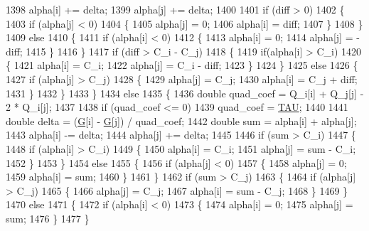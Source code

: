 \begin{DoxyCode}
1398       alpha[i] += delta;
1399       alpha[j] += delta;
1400       
1401       \textcolor{keywordflow}{if}  (diff > 0)
1402       \{
1403         \textcolor{keywordflow}{if}  (alpha[j] < 0)
1404         \{
1405           alpha[j] = 0;
1406           alpha[i] = diff;
1407         \}
1408       \}
1409       \textcolor{keywordflow}{else}
1410       \{
1411         \textcolor{keywordflow}{if}  (alpha[i] < 0)
1412         \{
1413           alpha[i] = 0;
1414           alpha[j] = -diff;
1415         \}
1416       \}
1417       \textcolor{keywordflow}{if}  (diff > C\_i - C\_j)
1418       \{
1419         \textcolor{keywordflow}{if}(alpha[i] > C\_i)
1420         \{
1421           alpha[i] = C\_i;
1422           alpha[j] = C\_i - diff;
1423         \}
1424       \}
1425       \textcolor{keywordflow}{else}
1426       \{
1427         \textcolor{keywordflow}{if}  (alpha[j] > C\_j)
1428         \{
1429           alpha[j] = C\_j;
1430           alpha[i] = C\_j + diff;
1431         \}
1432       \}
1433     \}
1434     \textcolor{keywordflow}{else}
1435     \{
1436       \textcolor{keywordtype}{double} quad\_coef = Q\_i[i] + Q\_j[j] - 2 * Q\_i[j];
1437 
1438       \textcolor{keywordflow}{if}  (quad\_coef <= 0)
1439         quad\_coef = \hyperlink{svm2_8cpp_a3d8c9c145887af5174ba4cc6789862ad}{TAU};
1440 
1441       \textcolor{keywordtype}{double} delta = (\hyperlink{class_s_v_m289___m_f_s_1_1_solver_a96465496d62f5c9566275270d7a54a4f}{G}[i] - \hyperlink{class_s_v_m289___m_f_s_1_1_solver_a96465496d62f5c9566275270d7a54a4f}{G}[j]) / quad\_coef;
1442       \textcolor{keywordtype}{double} sum = alpha[i] + alpha[j];
1443       alpha[i] -= delta;
1444       alpha[j] += delta;
1445 
1446       \textcolor{keywordflow}{if}  (sum > C\_i)
1447       \{
1448         \textcolor{keywordflow}{if}  (alpha[i] > C\_i)
1449         \{
1450           alpha[i] = C\_i;
1451           alpha[j] = sum - C\_i;
1452         \}
1453       \}
1454       \textcolor{keywordflow}{else}
1455       \{
1456         \textcolor{keywordflow}{if}  (alpha[j] < 0)
1457         \{
1458           alpha[j] = 0;
1459           alpha[i] = sum;
1460         \}
1461       \}
1462       \textcolor{keywordflow}{if}  (sum > C\_j)
1463       \{
1464         \textcolor{keywordflow}{if}  (alpha[j] > C\_j)
1465         \{
1466           alpha[j] = C\_j;
1467           alpha[i] = sum - C\_j;
1468         \}
1469       \}
1470       \textcolor{keywordflow}{else}
1471       \{
1472         \textcolor{keywordflow}{if}  (alpha[i] < 0)
1473         \{
1474           alpha[i] = 0;
1475           alpha[j] = sum;
1476         \}
1477       \}

\end{DoxyCode}
